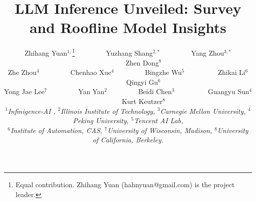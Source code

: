 \documentclass[10pt,twocolumn,letterpaper]{article}
\title{LLM Inference Unveiled: Survey and Roofline Model Insights}
\author{
  Zhihang Yuan$^{1,}$\thanks{Equal contribution. Zhihang Yuan (hahnyuan@gmail.com) is the project leader.}~~~~~~~~~Yuzhang Shang$^{2,*}$~~~~~~~~~Yang Zhou$^{3,*}$~~~~~~~~~Zhen Dong$^{8}$\\
  Zhe Zhou$^{4}$~~~~~~~~~Chenhao Xue$^{4}$~~~~~~~~~Bingzhe Wu$^{5}$~~~~~~~~~ Zhikai Li$^{6}$~~~~~~~~~Qingyi Gu$^{6}$\\
  Yong Jae Lee$^{7}$~~~~~~~~~Yan Yan$^{2}$~~~~~~~~~Beidi Chen$^{3}$~~~~~~~~~ Guangyu Sun$^{4}$~~~~~~~~~Kurt Keutzer$^{8}$ \vspace{8pt} \\
  \fontsize{11}{15}\selectfont \textit{$^{1}$Infinigence-AI , $^{2}$Illinois Institute of Technology, $^{3}$Carnegie Mellon University, $^{4}$Peking University, $^{5}$Tencent AI Lab,}\\
  \fontsize{11}{15}\selectfont \textit{$^{6}$Institute of Automation, CAS, $^{7}$University of Wisconsin, Madison, $^{8}$University of California, Berkeley.}
}
\begin{document}
\maketitle














\clearpage
{
    \small
    
    
}

% 
\end{document}
